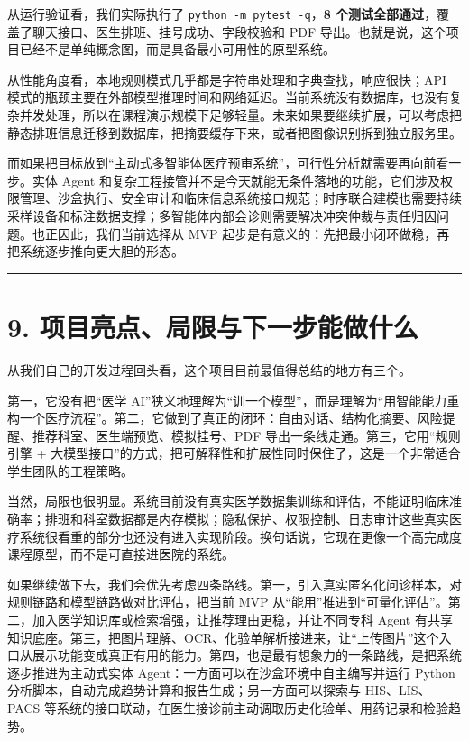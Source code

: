 \documentclass[
  chinese,
  12pt,
  UTF8,
  a4paper]{ctexart}
\begin{document}
从运行验证看，我们实际执行了 \texttt{python\ -m\ pytest\ -q}，\textbf{8 个测试全部通过}，覆盖了聊天接口、医生排班、挂号成功、字段校验和 PDF 导出。也就是说，这个项目已经不是单纯概念图，而是具备最小可用性的原型系统。

从性能角度看，本地规则模式几乎都是字符串处理和字典查找，响应很快；API 模式的瓶颈主要在外部模型推理时间和网络延迟。当前系统没有数据库，也没有复杂并发处理，所以在课程演示规模下足够轻量。未来如果要继续扩展，可以考虑把静态排班信息迁移到数据库，把摘要缓存下来，或者把图像识别拆到独立服务里。

而如果把目标放到``主动式多智能体医疗预审系统''，可行性分析就需要再向前看一步。实体 Agent 和复杂工程接管并不是今天就能无条件落地的功能，它们涉及权限管理、沙盒执行、安全审计和临床信息系统接口规范；时序联合建模也需要持续采样设备和标注数据支撑；多智能体内部会诊则需要解决冲突仲裁与责任归因问题。也正因此，我们当前选择从 MVP 起步是有意义的：先把最小闭环做稳，再把系统逐步推向更大胆的形态。

\begin{center}\rule{0.5\linewidth}{0.5pt}\end{center}

\section{9. 项目亮点、局限与下一步能做什么}\label{9-ux9879ux76eeux4eaeux70b9ux5c40ux9650ux4e0eux4e0bux4e00ux6b65ux80fdux505aux4ec0ux4e48}

从我们自己的开发过程回头看，这个项目目前最值得总结的地方有三个。

第一，它没有把``医学 AI''狭义地理解为``训一个模型''，而是理解为``用智能能力重构一个医疗流程''。第二，它做到了真正的闭环：自由对话、结构化摘要、风险提醒、推荐科室、医生端预览、模拟挂号、PDF 导出一条线走通。第三，它用``规则引擎 + 大模型接口''的方式，把可解释性和扩展性同时保住了，这是一个非常适合学生团队的工程策略。

当然，局限也很明显。系统目前没有真实医学数据集训练和评估，不能证明临床准确率；排班和科室数据都是内存模拟；隐私保护、权限控制、日志审计这些真实医疗系统很看重的部分也还没有进入实现阶段。换句话说，它现在更像一个高完成度课程原型，而不是可直接进医院的系统。

如果继续做下去，我们会优先考虑四条路线。第一，引入真实匿名化问诊样本，对规则链路和模型链路做对比评估，把当前 MVP 从``能用''推进到``可量化评估''。第二，加入医学知识库或检索增强，让推荐理由更稳，并让不同专科 Agent 有共享知识底座。第三，把图片理解、OCR、化验单解析接进来，让``上传图片''这个入口从展示功能变成真正有用的能力。第四，也是最有想象力的一条路线，是把系统逐步推进为主动式实体 Agent：一方面可以在沙盒环境中自主编写并运行 Python 分析脚本，自动完成趋势计算和报告生成；另一方面可以探索与 HIS、LIS、PACS 等系统的接口联动，在医生接诊前主动调取历史化验单、用药记录和检验趋势。
\end{document}
